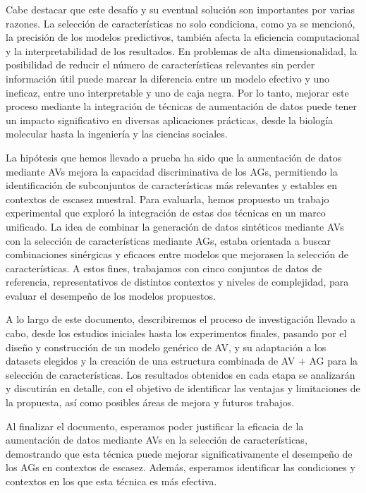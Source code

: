 Cabe destacar que este desafío y su eventual solución son importantes por varias razones. La selección de características no solo condiciona, como ya se mencionó, la precisión de los modelos predictivos, también afecta la eficiencia computacional y la interpretabilidad de los resultados. En problemas de alta dimensionalidad, la posibilidad de reducir el número de características relevantes sin perder información útil puede marcar la diferencia entre un modelo efectivo y uno ineficaz, entre uno interpretable y uno de caja negra. Por lo tanto, mejorar este proceso mediante la integración de técnicas de aumentación de datos puede tener un impacto significativo en diversas aplicaciones prácticas, desde la biología molecular hasta la ingeniería y las ciencias sociales.

La hipótesis que hemos llevado a prueba ha sido que la aumentación de datos mediante AVs mejora la capacidad discriminativa de los AGs, permitiendo la identificación de subconjuntos de características más relevantes y estables en contextos de escasez muestral. Para evaluarla, hemos propuesto un trabajo experimental que exploró la integración de estas dos técnicas en un marco unificado. La idea de combinar la generación de datos sintéticos mediante AVs con la selección de características mediante AGs, estaba orientada a buscar combinaciones sinérgicas y eficaces entre modelos que mejorasen la selección de características. A estos fines, trabajamos con cinco conjuntos de datos de referencia, representativos de distintos contextos y niveles de complejidad, para evaluar el desempeño de los modelos propuestos.

A lo largo de este documento, describiremos el proceso de investigación llevado a cabo, desde los estudios iniciales hasta los experimentos finales, pasando por el diseño y construcción de un modelo genérico de AV, y su adaptación a los datasets elegidos y la creación de una estructura combinada de AV + AG para la selección de características. Los resultados obtenidos en cada etapa se analizarán y discutirán en detalle, con el objetivo de identificar las ventajas y limitaciones de la propuesta, así como posibles áreas de mejora y futuros trabajos.

Al finalizar el documento, esperamos poder justificar la eficacia de la aumentación de datos mediante AVs en la selección de características, demostrando que esta técnica puede mejorar significativamente el desempeño de los AGs en contextos de escasez. Además, esperamos identificar las condiciones y contextos en los que esta técnica es más efectiva.

